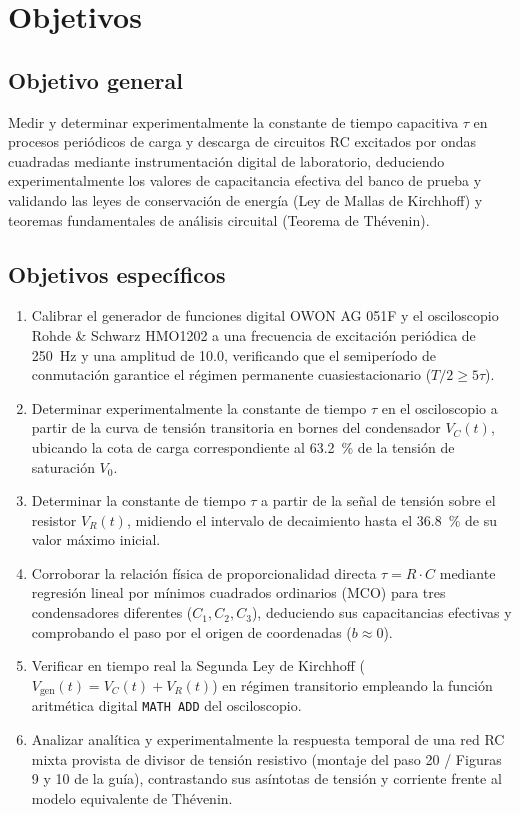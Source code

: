 
\section{Objetivos}
\label{sec:objetivos}

\subsection{Objetivo general}

Medir y determinar experimentalmente la constante de tiempo capacitiva $\tau$ en procesos periódicos de carga y descarga de circuitos RC excitados por ondas cuadradas mediante instrumentación digital de laboratorio, deduciendo experimentalmente los valores de capacitancia efectiva del banco de prueba y validando las leyes de conservación de energía (Ley de Mallas de Kirchhoff) y teoremas fundamentales de análisis circuital (Teorema de Thévenin).

\subsection{Objetivos específicos}

\begin{enumerate}
    \item Calibrar el generador de funciones digital OWON AG 051F y el osciloscopio Rohde \& Schwarz HMO1202 a una frecuencia de excitación periódica de \qty{250}{\hertz} y una amplitud de \qty{10,0}{\voltpp}, verificando que el semiperíodo de conmutación garantice el régimen permanente cuasiestacionario ($T/2 \ge 5\tau$).
    \item Determinar experimentalmente la constante de tiempo $\tau$ en el osciloscopio a partir de la curva de tensión transitoria en bornes del condensador $V_C(t)$, ubicando la cota de carga correspondiente al \qty{63,2}{\percent} de la tensión de saturación $V_0$.
    \item Determinar la constante de tiempo $\tau$ a partir de la señal de tensión sobre el resistor $V_R(t)$, midiendo el intervalo de decaimiento hasta el \qty{36,8}{\percent} de su valor máximo inicial.
    \item Corroborar la relación física de proporcionalidad directa $\tau = R \cdot C$ mediante regresión lineal por mínimos cuadrados ordinarios (MCO) para tres condensadores diferentes ($C_1, C_2, C_3$), deduciendo sus capacitancias efectivas y comprobando el paso por el origen de coordenadas ($b \approx 0$).
    \item Verificar en tiempo real la Segunda Ley de Kirchhoff ($V_{\text{gen}}(t) = V_C(t) + V_R(t)$) en régimen transitorio empleando la función aritmética digital \texttt{MATH ADD} del osciloscopio.
    \item Analizar analítica y experimentalmente la respuesta temporal de una red RC mixta provista de divisor de tensión resistivo (montaje del paso 20 / Figuras 9 y 10 de la guía), contrastando sus asíntotas de tensión y corriente frente al modelo equivalente de Thévenin.
\end{enumerate}
